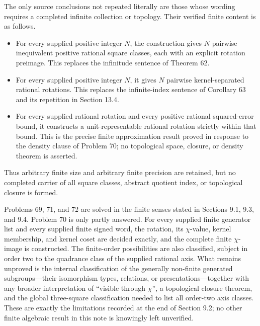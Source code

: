 \documentclass[11pt]{article}
\begin{document}
The only source conclusions not repeated literally are those whose wording
requires a completed infinite collection or topology.  Their verified finite
content is as follows.
\begin{itemize}
\item For every supplied positive integer \(N\), the construction gives
\(N\) pairwise inequivalent positive rational square classes, each with an
explicit rotation preimage.  This replaces the infinitude sentence of
Theorem 62.
\item For every supplied positive integer \(N\), it gives \(N\) pairwise
kernel-separated rational rotations.  This replaces the infinite-index
sentence of Corollary 63 and its repetition in Section 13.4.
\item For every supplied rational rotation and every positive rational
squared-error bound, it constructs a unit-representable rational rotation
strictly within that bound.  This is the precise finite approximation result
proved in response to the density clause of Problem 70; no topological space,
closure, or density theorem is asserted.
\end{itemize}
Thus arbitrary finite size and arbitrary finite precision are retained, but
no completed carrier of all square classes, abstract quotient index, or
topological closure is formed.

Problems 69, 71, and 72 are solved in the finite senses stated in Sections
9.1, 9.3, and 9.4.  Problem 70 is only partly answered.  For every supplied
finite generator list and every supplied finite signed word, the rotation,
its \(\chi\)-value, kernel membership, and kernel coset are decided exactly,
and the complete finite \(\chi\)-image is constructed.  The finite-order
possibilities are also classified, subject in order two to the quadrance
class of the supplied rational axis.  What remains unproved is the internal
classification of the generally non-finite generated subgroups---their
isomorphism types, relations, or presentations---together with any broader
interpretation of ``visible through \(\chi\)'', a topological closure theorem,
and the global three-square classification needed to list all order-two axis
classes.  These are exactly the limitations recorded at the end of Section
9.2; no other finite algebraic result in this note is knowingly left
unverified.

\clearpage
\end{document}
